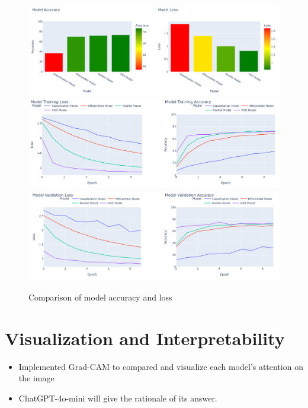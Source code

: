 \documentclass{article}
\begin{document}
\begin{figure}[H]
    \centering
    \includegraphics[width=\textwidth]{eval1.png}
    \includegraphics[width=\textwidth]{eval2.png}
    \includegraphics[width=\textwidth]{eval3.png}
    \caption{Comparison of model accuracy and loss}
    \label{fig:models}
\end{figure}


\section{Visualization and Interpretability}
\begin{itemize}
    \item Implemented Grad-CAM to compared and visualize each model's attention on the image
    \item ChatGPT-4o-mini will give the rationale of its answer.
\end{itemize}
\end{document}
